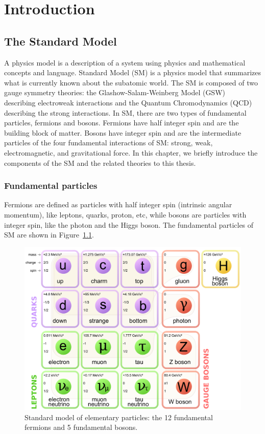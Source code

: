 \chapter{Introduction}
\label{label:chapIntro}

\section{The Standard Model}
A physics model is a description of a system using physics and mathematical concepts and language.
Standard Model (SM) is a physics model that summarizes what is currently known about the subatomic world. The SM is composed of two gauge symmetry theories: the Glashow-Salam-Weinberg Model (GSW)~\cite{Glashow, Salam, Weinberg} describing electroweak interactions and the Quantum Chromodynamics 
(QCD)~\cite{QCD} describing the strong interactions. 
In SM, there are 
two types of fundamental particles, fermions and bosons. Fermions have half integer spin and are the building block of matter. Bosons have integer spin and are the intermediate particles of the four fundamental interactions of SM: strong, weak, electromagnetic, and
gravitational force. 
In this chapter, we briefly introduce the components of the SM and the related theories to this thesis. 


\subsection{Fundamental particles}

Fermions are defined as particles with half integer spin (intrinsic angular momentum), like leptons, quarks, proton, etc, while bosons are particles with integer spin, like the photon and the Higgs boson.
The fundamental particles of SM are shown in Figure~\ref{fig:SMParticles}. 

\begin{figure}[!htbp]
\centering
\includegraphics[width=.85\textwidth]{figures/Standard_Model_particles.png}
\caption{Standard model of elementary particles: 
the 12 fundamental fermions and 5 fundamental bosons.~\cite{particleImage}}
\label{fig:SMParticles}
\end{figure}  


